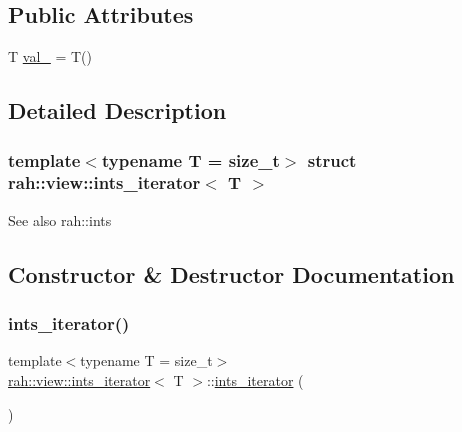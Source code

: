 \subsection*{Public Attributes}
\begin{DoxyCompactItemize}
\item 
T \mbox{\hyperlink{structrah_1_1view_1_1ints__iterator_a0136f64c4fdb5dd020ba213c1cc57f28}{val\+\_\+}} = T()
\end{DoxyCompactItemize}


\subsection{Detailed Description}
\subsubsection*{template$<$typename T = size\+\_\+t$>$\newline
struct rah\+::view\+::ints\+\_\+iterator$<$ T $>$}

\begin{DoxySeeAlso}{See also}
rah\+::ints 
\end{DoxySeeAlso}


\subsection{Constructor \& Destructor Documentation}
\mbox{\label{structrah_1_1view_1_1ints__iterator_a2b0f48ff5ad3b3754ea2818bfbefa9d5}} 
\subsubsection{\texorpdfstring{ints\_iterator()}{ints\_iterator()}\hspace{0.1cm}{\footnotesize\ttfamily [1/2]}}
{\footnotesize\ttfamily template$<$typename T  = size\+\_\+t$>$ \\
\mbox{\hyperlink{structrah_1_1view_1_1ints__iterator}{rah\+::view\+::ints\+\_\+iterator}}$<$ T $>$\+::\mbox{\hyperlink{structrah_1_1view_1_1ints__iterator}{ints\+\_\+iterator}} (\begin{DoxyParamCaption}{ }\end{DoxyParamCaption})\hspace{0.3cm}{\ttfamily [default]}}

